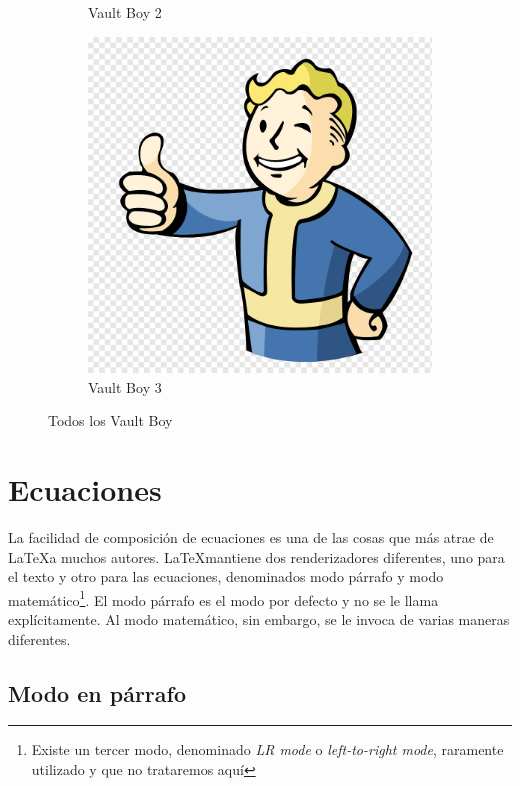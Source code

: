 \begin{figure}[H]
\begin{subfigure}{.3\textwidth}
		\caption{Vault Boy 2}
	\end{subfigure}%
	\begin{subfigure}{.3\textwidth}
		\includegraphics[width=\textwidth]{figures/vault-boy.png}
		\caption{Vault Boy 3}
	\end{subfigure}
	\caption{\label{fig:subfigures}Todos los Vault Boy}
\end{figure}

\section{Ecuaciones}

La facilidad de composición de ecuaciones es una de las cosas que más atrae de \LaTeX\space a muchos autores. \LaTeX mantiene dos renderizadores diferentes, uno para el texto y otro para las ecuaciones, denominados modo párrafo y modo matemático\footnote{Existe un tercer modo, denominado \textit{LR mode} o \textit{left-to-right mode}, raramente utilizado y que no trataremos aquí}. El modo párrafo es el modo por defecto y no se le llama explícitamente. Al modo matemático, sin embargo, se le invoca de varias maneras diferentes.

\subsection{Modo en párrafo}

